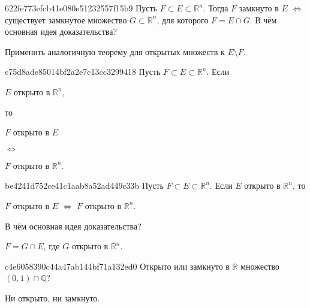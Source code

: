 \begin{note}{622fe773efcb41e080e51232557f15b9}
    Пусть \({ F \subset E \subset \mathbb R^{n} }\).
    Тогда \({ F }\) замкнуто в \({ E }\) \({ \iff }\) существует замкнутое множество \({ G \subset \mathbb R^{n} }\), для которого \({ F = E \cap G }\).
    В чём основная идея доказательства?

    \begin{cloze}{1}
        Применить аналогичную теорему для открытых множеств к \({ E \setminus F }\).
    \end{cloze}
\end{note}

\begin{note}{c75d8ade85014bf2a2e7c13cc3299418}
    Пусть \({ F \subset E \subset \mathbb R^{n} }\).
    Если \begin{icloze}{4}\({ E }\) открыто в \({ \mathbb R^{n} }\),\end{icloze} то
    \begin{center}
        \begin{icloze}{2}\({ F }\) открыто в \({ E }\)\end{icloze} \begin{icloze}{3}\({ \iff }\)\end{icloze} \begin{icloze}{1}\({ F }\) открыто в \({ \mathbb R^{n} }\).\end{icloze}
    \end{center}
\end{note}

\begin{note}{be4241d752ce41c1aab8a52ad449c33b}
    Пусть \({ F \subset E \subset \mathbb R^{n} }\).
    Если \({ E }\) открыто в \({ \mathbb R^{n} }\), то
    \begin{center}
        \({ F }\) открыто в \({ E }\) \({ \iff }\) \({ F }\) открыто в \({ \mathbb R^{n} }\).
    \end{center}
    В чём основная идея доказательства?

    \begin{cloze}{1}
        \({ F = G \cap E }\), где \({ G }\) открыто в \({ \mathbb R^{n} }\).
    \end{cloze}
\end{note}

\begin{note}{c4e6058390c44a47ab144bf71a132ed0}
    Открыто или замкнуто в \({ \mathbb R }\) множество \({ (0, 1) \cap \mathbb Q }\)?

    \begin{cloze}{1}
        Ни открыто, ни замкнуто.
    \end{cloze}
\end{note}

